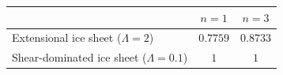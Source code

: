 \begin{tabular}{lcc}
\toprule
  & $n=1$ & $n=3$ \\
\midrule
Extensional ice sheet ($\Lambda=2$) & $0.7759$ & $0.8733$ \\
Shear-dominated ice sheet ($\Lambda=0.1$) & $1$ & $1$ \\
\bottomrule
\end{tabular}
